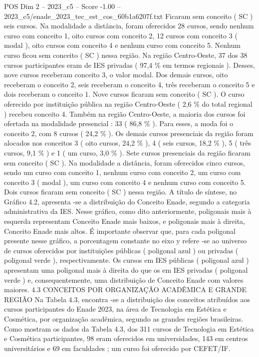 \begin{textsample}{POS Dim 2 – 2023\_c5 – Score -1.00 – 2023\_c5/enade\_2023\_tec\_est\_cos\_60b1a6207f.txt}
Ficaram sem conceito ( SC ) seis cursos.
Na modalidade a distância, foram oferecidos 28 cursos, sendo nenhum curso com conceito 1, oito cursos com conceito 2, 12 cursos com conceito 3 ( modal ), oito cursos com conceito 4 e nenhum curso com conceito 5.
Nenhum curso ficou sem conceito ( SC ) nessa região.
Na região Centro-Oeste, 37 dos 38 cursos participantes eram de IES privadas ( 97,4 \% em termos regionais ).
Desses, nove cursos receberam conceito 3, o valor modal.
Dos demais cursos, oito receberam o conceito 2, seis receberam o conceito 4, três receberam o conceito 5 e dois receberam o conceito 1.
Nove cursos ficaram sem conceito ( SC ).
O curso oferecido por instituição pública na região Centro-Oeste ( 2,6 \% do total regional ) recebeu conceito 4.
Também na região Centro-Oeste, a maioria dos cursos foi ofertada na modalidade presencial : 33 ( 86,8 \% ).
Para esses, a moda foi o conceito 2, com 8 cursos ( 24,2 \% ).
Os demais cursos presenciais da região foram alocados nos conceitos 3 ( oito cursos, 24,2 \% ), 4 ( seis cursos, 18,2 \% ), 5 ( três cursos, 9,1 \% ) e 1 ( um curso, 3,0 \% ).
Sete cursos presenciais da região ficaram sem conceito ( SC ).
Na modalidade a distância, foram oferecidos cinco cursos, sendo um curso com conceito 1, nenhum curso com conceito 2, um curso com conceito 3 ( modal ), um curso com conceito 4 e nenhum curso com conceito 5.
Dois cursos ficaram sem conceito ( SC ) nessa região.
A título de síntese, no Gráfico 4.2, apresenta -se a distribuição do Conceito Enade, segundo a categoria administrativa da IES.
Nesse gráfico, como dito anteriormente, poligonais mais à esquerda representam Conceito Enade mais baixos, e poligonais mais à direita, Conceito Enade mais altos.
É importante observar que, para cada poligonal presente nesse gráfico, a porcentagem constante no eixo y refere -se ao universo de cursos oferecidos por instituições públicas ( poligonal azul ) ou privadas ( poligonal verde ), respectivamente.
Os cursos em IES públicas ( poligonal azul ) apresentam uma poligonal mais à direita do que os em IES privadas ( poligonal verde ) e, consequentemente, uma distribuição de Conceito Enade com valores maiores. 4.3 CONCEITOS POR ORGANIZAÇÃO ACADÊMICA E GRANDE REGIÃO Na Tabela 4.3, encontra -se a distribuição dos conceitos atribuídos aos cursos participantes do Enade 2023, na área de Tecnologia em Estética e Cosmética, por organização acadêmica, segundo as grandes regiões brasileiras.
Como mostram os dados da Tabela 4.3, dos 311 cursos de Tecnologia em Estética e Cosmética participantes, 98 eram oferecidos em universidades, 143 em centros universitários e 69 em faculdades ; um curso foi oferecido por CEFET/IF.

\end{textsample}
